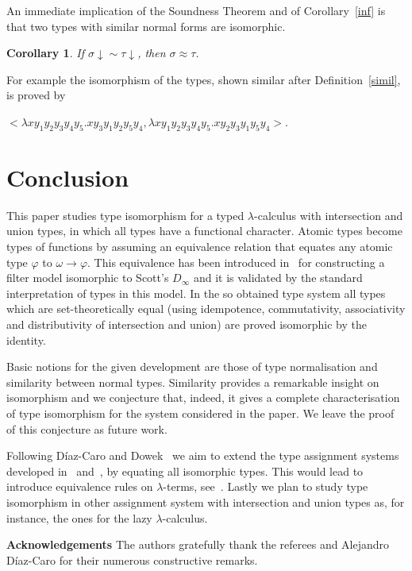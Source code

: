 \documentclass[UKenglish]{eptcs}
\newtheorem{corollary}[fact]{Corollary}
\newcommand{\tA}{\sigma}       \newcommand{\tB}{\tau}
\newcommand{\tu}{\omega}
\newcommand{\tsi}{\sim}
\newcommand{\iso}{\approx}
\newcommand{\nf}[1]{#1\!\!\downarrow}
\newcommand{\myformula}[1]{\\[0.5pt]\centerline{#1}}
\begin{document}
An immediate implication of the Soundness Theorem and of Corollary~\ref{inf} is that two types  with similar normal forms are isomorphic.

\begin{corollary} \label{sum}
If $\nf\tA \tsi \nf\tB$, then $\tA \iso \tB$.
\end {corollary}

For example the isomorphism of the types, shown similar after Definition~\ref{simil}, is proved by
\myformula{$<\lambda xy_1y_2y_3y_4y_5. xy_3y_1y_2y_5y_4, \lambda x y_1y_2y_3y_4y_5. xy_2y_3y_1y_5y_4>$.}



\section{Conclusion}\label{conc}

This paper studies type isomorphism for a typed $\lambda$-calculus with intersection and union types, in which all types have a functional character.
 Atomic types become types of functions by assuming
 an equivalence relation that equates any atomic type $\varphi$ to  $\tu\to\varphi$. This equivalence has been introduced in~\cite{CDHL84} for constructing a filter model isomorphic to Scott's $D_\infty$ and it is validated by the standard interpretation of types in this model. In the so obtained type system all types which are set-theoretically equal (using idempotence, commutativity, associativity and distributivity of intersection and union) are proved isomorphic
by the identity.

Basic notions for the given development are those of type normalisation and similarity between normal types. Similarity provides a remarkable insight on isomorphism and we conjecture that, indeed, it gives a complete characterisation of type isomorphism for the system considered in the paper. We leave the proof of this conjecture as future work.

Following  D\'iaz-Caro and Dowek~\cite{DD14} we aim to extend the type assignment systems developed in~\cite{CDMZ13}  and~\cite{CDMZ13a}, by equating all isomorphic types.  This would lead to introduce equivalence rules on $\lambda$-terms, see~\cite{DD14}.
Lastly we plan to study type isomorphism in other assignment system with intersection and union types as, for instance, the ones for the lazy $\lambda$-calculus.\\

\smallskip

\noindent
{\bf Acknowledgements} The authors gratefully thank the referees  and Alejandro D\'iaz-Caro for their numerous constructive remarks.




\end{document}
